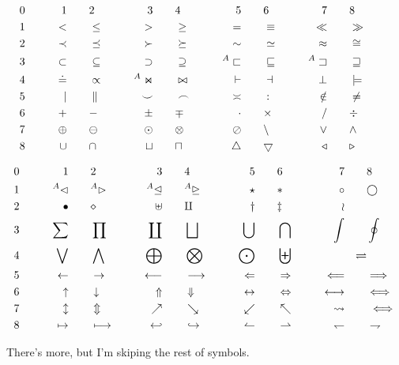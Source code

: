 \begin{displaymath}
\begin{aligned}
& 0 \qquad& 1 \qquad& 2 \qquad& 3 \qquad& 4 \qquad& 5 \qquad& 6 \qquad& 7 \qquad& 8\\
& 1 \qquad& < \qquad& \le \qquad& > \qquad& \ge \qquad& = \qquad& \equiv \qquad& \ll
\qquad& \gg\\
& 2 \qquad& \prec \qquad& \preceq \qquad& \succ \qquad& \succeq \qquad& \sim \qquad&
\simeq \qquad& \approx \qquad& \cong\\
& 3 \qquad& \subset \qquad& \subseteq \qquad& \supset \qquad& \supseteq \qquad&
{}^A\sqsubset \qquad& \sqsubseteq \qquad& {}^A\sqsupset \qquad& \sqsupseteq\\
& 4 \qquad& \doteq \qquad& \propto \qquad& {}^A\Join \qquad& \bowtie \qquad& \vdash
\qquad& \dashv \qquad& \perp \qquad& \models\\
& 5 \qquad& \mid \qquad& \parallel \qquad& \smile \qquad& \frown \qquad& \asymp
\qquad& : \qquad& \notin \qquad& \neq\\
& 6 \qquad& + \qquad& - \qquad& \pm \qquad& \mp \qquad& \cdot \qquad& \times \qquad& /
\qquad& \div \qquad& \\
& 7 \qquad& \oplus \qquad& \ominus \qquad& \odot \qquad& \otimes \qquad& \oslash
\qquad& \setminus \qquad& \lor \qquad& \land\\
& 8 \qquad& \cup \qquad& \cap \qquad& \sqcup \qquad& \sqcap \qquad& \bigtriangleup
\qquad& \bigtriangledown \qquad& \triangleleft \qquad& \triangleright \\
\end{aligned}
\end{displaymath}

\begin{displaymath}
\begin{aligned}
& 0 \qquad& 1 \qquad& 2 \qquad& 3 \qquad& 4 \qquad& 5 \qquad& 6 \qquad& 7 \qquad& 8\\
& 1 \qquad& {}^A\lhd \qquad& {}^A\rhd \qquad& {}^A\unlhd \qquad& {}^A\unrhd \qquad&
\star \qquad& \ast \qquad& \circ \qquad& \bigcirc\\
& 2 \qquad& \bullet \qquad& \diamond \qquad& \uplus \qquad& \amalg \qquad& \dagger
\qquad& \ddagger \qquad& \wr \qquad& {}\\
& 3 \qquad& \sum \qquad& \prod \qquad& \coprod \qquad& \bigsqcup \qquad& \bigcup
\qquad& \bigcap \qquad& \int \qquad& \oint\\
& 4 \qquad& \bigvee \qquad& \bigwedge \qquad& \bigoplus \qquad& \bigotimes \qquad&
\bigodot \qquad& \biguplus \qquad& \rightleftharpoons \\
& 5 \qquad& \gets \qquad& \to \qquad& \longleftarrow \qquad& \longrightarrow
\qquad& \Leftarrow \qquad& \Rightarrow \qquad& \Longleftarrow \qquad&
\Longrightarrow\\
& 6 \qquad& \uparrow \qquad& \downarrow \qquad& \Uparrow \qquad& \Downarrow \qquad&
\leftrightarrow \qquad& \Leftrightarrow \qquad& \longleftrightarrow \qquad&
\Longleftrightarrow\\
& 7 \qquad& \updownarrow \qquad& \Updownarrow \qquad& \nearrow \qquad& \searrow
\qquad& \swarrow \qquad& \nwarrow \qquad& \leadsto \qquad& \iff\\
& 8 \qquad& \mapsto \qquad& \longmapsto \qquad& \hookleftarrow \qquad&
\hookrightarrow \qquad& \leftharpoonup \qquad& \rightharpoonup \qquad&
\leftharpoondown \qquad& \rightharpoondown \\
\end{aligned}
\end{displaymath}

There's more, but I'm skiping the rest of symbols.

